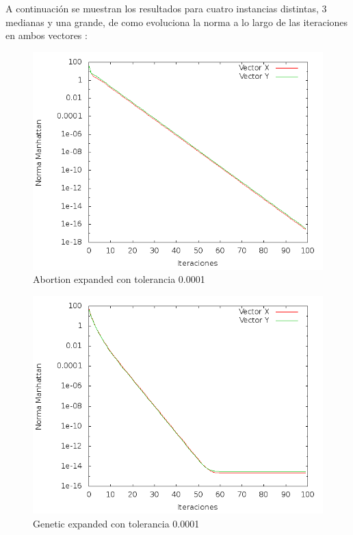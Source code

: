 A continuación se muestran los resultados para cuatro instancias distintas, 3 medianas y una grande, de como evoluciona la norma a lo largo de las iteraciones en ambos vectores :
\begin{figure}[!htb]
\begin{center}
       \includegraphics[scale=0.5]{imagenes/hits-abortion-expanded.png}
       \caption{Abortion expanded con tolerancia 0.0001}
  \end{center}
\end{figure}
\begin{figure}[!htb]
\begin{center}
        \includegraphics[scale=0.5]{imagenes/hits-genetic-expanded.png}
       \caption{Genetic expanded con tolerancia 0.0001}
       \end{center}
\end{figure}

